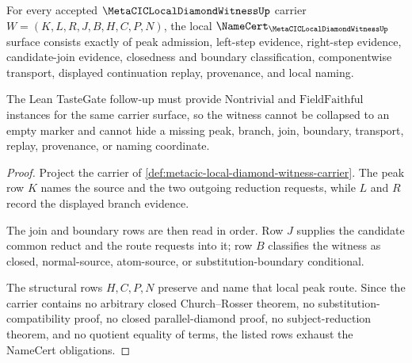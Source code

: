 \begin{theorem}
\label{thm:metacic-local-diamond-witness-namecert-obligations}
For every accepted $\MetaCICLocalDiamondWitnessUp$ carrier $W=(K,L,R,J,B,H,C,P,N)$, the local $\NameCert_{\MetaCICLocalDiamondWitnessUp}$ surface consists exactly of peak admission, left-step evidence, right-step evidence, candidate-join evidence, closedness and boundary classification, componentwise transport, displayed continuation replay, provenance, and local naming.

The Lean TasteGate follow-up must provide $\mathrm{Nontrivial}$ and $\mathrm{FieldFaithful}$ instances for the same carrier surface, so the witness cannot be collapsed to an empty marker and cannot hide a missing peak, branch, join, boundary, transport, replay, provenance, or naming coordinate.
\end{theorem}
\begin{proof}
Project the carrier of \autoref{def:metacic-local-diamond-witness-carrier}. The peak row $K$ names the source and the two outgoing reduction requests, while $L$ and $R$ record the displayed branch evidence.

The join and boundary rows are then read in order. Row $J$ supplies the candidate common reduct and the route requests into it; row $B$ classifies the witness as closed, normal-source, atom-source, or substitution-boundary conditional.

The structural rows $H,C,P,N$ preserve and name that local peak route. Since the carrier contains no arbitrary closed Church--Rosser theorem, no substitution-compatibility proof, no closed parallel-diamond proof, no subject-reduction theorem, and no quotient equality of terms, the listed rows exhaust the NameCert obligations.
\end{proof}

